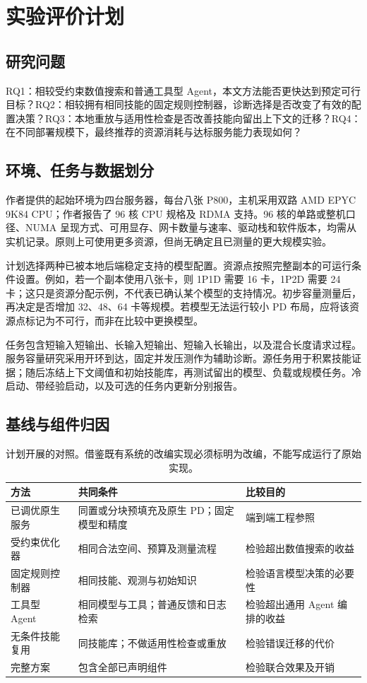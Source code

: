 \documentclass[UTF8,11pt,a4paper,fontset=windows]{ctexart}
\begin{document}
\section{实验评价计划}
\subsection{研究问题}
RQ1：相较受约束数值搜索和普通工具型 Agent，本文方法能否更快达到预定可行目标？RQ2：相较拥有相同技能的固定规则控制器，诊断选择是否改变了有效的配置决策？RQ3：本地重放与适用性检查是否改善技能向留出上下文的迁移？RQ4：在不同部署规模下，最终推荐的资源消耗与达标服务能力表现如何？

\subsection{环境、任务与数据划分}
作者提供的起始环境为四台服务器，每台八张 P800，主机采用双路 AMD EPYC 9K84 CPU；作者报告了 96 核 CPU 规格及 RDMA 支持。96 核的单路或整机口径、NUMA 呈现方式、可用显存、网卡数量与速率、驱动栈和软件版本，均需从实机记录。原则上可使用更多资源，但尚无确定且已测量的更大规模实验。

计划选择两种已被本地后端稳定支持的模型配置。资源点按照完整副本的可运行条件设置。例如，若一个副本使用八张卡，则 1P1D 需要 16 卡，1P2D 需要 24 卡；这只是资源分配示例，不代表已确认某个模型的支持情况。初步容量测量后，再决定是否增加 32、48、64 卡等规模。若模型无法运行较小 PD 布局，应将该资源点标记为不可行，而非在比较中更换模型。

任务包含短输入短输出、长输入短输出、短输入长输出，以及混合长度请求过程。服务容量研究采用开环到达，固定并发压测作为辅助诊断。源任务用于积累技能证据；随后冻结上下文阈值和初始技能库，再测试留出的模型、负载或规模任务。冷启动、带经验启动，以及可选的任务内更新分别报告。

\subsection{基线与组件归因}
\begin{table}[t]
\centering\small
\begin{tabularx}{\linewidth}{@{}>{\raggedright\arraybackslash}p{30mm}YY@{}}
\toprule
方法 & 共同条件 & 比较目的 \\
\midrule
已调优原生服务 & 同置或分块预填充及原生 PD；固定模型和精度 & 端到端工程参照 \\
受约束优化器 & 相同合法空间、预算及测量流程 & 检验超出数值搜索的收益 \\
固定规则控制器 & 相同技能、观测与初始知识 & 检验语言模型决策的必要性 \\
工具型 Agent & 相同模型与工具；普通反馈和日志检索 & 检验超出通用 Agent 编排的收益 \\
无条件技能复用 & 同技能库；不做适用性检查或重放 & 检验错误迁移的代价 \\
完整方案 & 包含全部已声明组件 & 检验联合效果及开销 \\
\bottomrule
\end{tabularx}
\caption{计划开展的对照。借鉴既有系统的改编实现必须标明为改编，不能写成运行了原始实现。}
\end{table}
\end{document}
